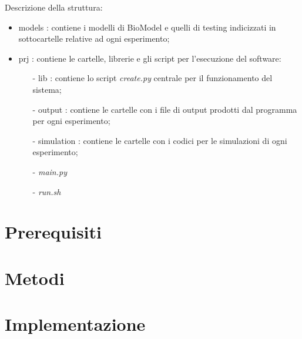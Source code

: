 \documentclass[Lau, oneside]{sapthesis}
\begin{document}
\noindent Descrizione della struttura:
\begin{itemize}
    \item models : contiene i modelli di BioModel e quelli di testing indicizzati in sottocartelle relative ad ogni esperimento; 
    \item prj : contiene le cartelle, librerie e gli script  per l'esecuzione del software: 
    \begin{itemize}
        \item[-] lib : contiene lo script \textit{create.py} centrale per il funzionamento del sistema;
        \item[-] output : contiene le cartelle con i file di output prodotti dal programma per ogni esperimento;
        \item[-] simulation : contiene le cartelle con i codici per le simulazioni di ogni esperimento;
        \item[-] \textit{main.py}
        \item[-] \textit{run.sh}
    \end{itemize}
\end{itemize}

%
\chapter{Prerequisiti}
\label{chap:2}

\chapter{Metodi}
\label{chap:3}

\chapter{Implementazione}
\label{chap:4}

\end{document}
